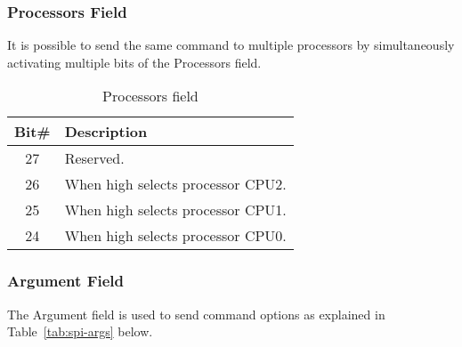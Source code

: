 \documentclass{ug}
\theoremstyle{plain}
\begin{document}
\subsubsection{Processors Field}

It is possible to send the same command to multiple processors by simultaneously
activating multiple bits of the Processors field.

\begin{table}[H]
  \begin{center}
    \begin{tabular}{|c|l|}
      \hline
      \rowcolor{iob-green}
      \textbf{Bit\#}  & \textbf{Description} \\
      \hline
      \hline

      27 & Reserved.\\ \hline

      \rowcolor{iob-blue} 26 & When high selects processor CPU2.\\ \hline

      25 & When high selects processor CPU1.\\ \hline

      \rowcolor{iob-blue} 24 & When high selects processor CPU0.\\ \hline

    \end{tabular}
    \caption{Processors field}
    \label{tab:spi-proc}
  \end{center}
\end{table}

\clearpage


\subsubsection{Argument Field}

The Argument field is used to send command options as explained in Table~\ref{tab:spi-args} below.
\end{document}
